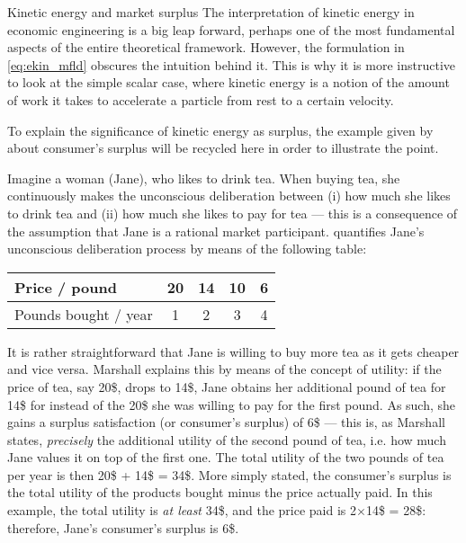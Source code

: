 \begin{econ}{Kinetic energy and market surplus}
    The interpretation of kinetic energy in economic engineering is a big leap forward, perhaps one of the most fundamental aspects of the entire theoretical framework. However, the formulation in \cref{eq:ekin_mfld} obscures the intuition behind it. This is why it is more instructive to look at the simple scalar case, where kinetic energy is a notion of the amount of work it takes to accelerate a particle from rest to a certain velocity.

    To explain the significance of kinetic energy as surplus, the example given by \citet[chap.~6]{Marshall1920} about consumer's surplus will be recycled here in order to illustrate the point.

    Imagine a woman (Jane), who likes to drink tea. When buying tea, she continuously makes the unconscious deliberation between (i) how much she likes to drink tea and (ii) how much she likes to pay for tea --- this is a consequence of the assumption that Jane is a rational market participant. \citeauthor{Marshall1920} quantifies Jane's unconscious deliberation process by means of the following table:
    \begin{center}
        \begin{tabular}{lcccc}
            Price / pound & 20 & 14 & 10 & 6 \\
            \midrule
            Pounds bought / year & 1 & 2 & 3 & 4 \\
        \end{tabular}
    \end{center}
    It is rather straightforward that Jane is willing to buy more tea as it gets cheaper and vice versa. Marshall explains this by means of the concept of utility: if the price of tea, say 20\$, drops to 14\$, Jane obtains her additional pound of tea for 14\$ for instead of the 20\$ she was willing to pay for the first pound. As such, she gains a surplus satisfaction (or consumer's surplus) of 6\$ --- this is, as Marshall states, \emph{precisely} the additional utility of the second pound of tea, i.e. how much Jane values it on top of the first one. The total utility of the two pounds of tea per year is then 20\$ +  14\$ = 34\$. More simply stated, the consumer's surplus is the total utility of the products bought minus the price actually paid. In this example, the total utility is \emph{at least} 34\$, and the price paid is 2$\times$14\$ = 28\$: therefore, Jane's consumer's surplus is 6\$. 
    \begin{center}

\end{center}
\end{econ}
